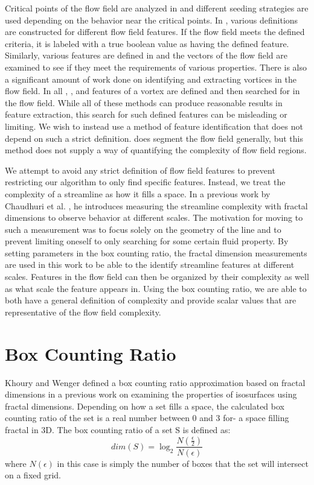 \documentclass{egpubl}
\begin{document}
Critical points of the flow field are analyzed in \cite{ye} and different seeding strategies are used depending on the behavior near the critical points.
In \cite{salzbrunn}, various definitions are constructed for different flow field features.
If the flow field meets the defined criteria, it is labeled with a true boolean value as having the defined feature.
Similarly, various features are defined in \cite{heiberg} and the vectors of the flow field are examined to see if they meet the requirements of various properties.
There is also a significant amount of work done on identifying and extracting vortices in the flow field.
In all \cite{sadarjoen1999}, \cite{sadarjoen1998}, and \cite{zhong} features of a vortex are defined and then searched for in the flow field.
While all of these methods can produce reasonable results in feature extraction, this search for such defined features can be misleading or limiting.
We wish to instead use a method of feature identification that does not depend on such a strict definition.
\cite{mahrous} does segment the flow field generally, but this method does not supply a way of quantifying the complexity of flow field regions.

We attempt to avoid any strict definition of flow field features to prevent restricting our algorithm to only find specific features. Instead, we treat the complexity of a streamline as how it fills a space. In a previous work by Chaudhuri et al. \cite{chaudhuri}, he introduces measuring the streamline complexity with fractal dimensions to observe behavior at different scales.
The motivation for moving to such a measurement was to focus solely on the geometry of the line and to prevent limiting oneself to only searching for some certain fluid property.
By setting parameters in the box counting ratio, the fractal dimension measurements are used in this work to be able to the identify streamline features at different scales.
Features in the flow field can then be organized by their complexity as well as what scale the feature appears in.
Using the box counting ratio, we are able to both have a general definition of complexity and provide scalar values that are representative of the flow field complexity.

\section{Box Counting Ratio} \label{sec:bcr}

Khoury and Wenger \cite{khoury} defined a box counting ratio approximation based on fractal dimensions in a previous work on examining the properties of isosurfaces using fractal dimensions.
Depending on how a set fills a space, the calculated box counting ratio of the set is a real number between 0 and 3 for- a space filling fractal in 3D.
The box counting ratio of a set S is defined as:
\begin{equation} dim(S) = \log_2\frac{N(\frac{\epsilon}{2})}{N(\epsilon)}\end{equation}
where $N(\epsilon)$ in this case is simply the number of boxes that the set will intersect on a fixed grid.
\end{document}
